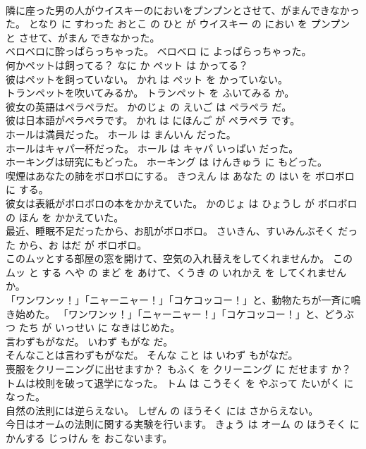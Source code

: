 \documentclass[8pt]{extreport}
\begin{document}
\begin{CJK}{UTF8}{min}
\\	隣に座った男の人がウイスキーのにおいをプンプンとさせて、がまんできなかった。	となり に すわった おとこ の ひと が ウイスキー の におい を プンプン と させて、がまん できなかった。	
\\	ベロベロに酔っぱらっちゃった。	ベロベロ に よっぱらっちゃった。	
\\	何かペットは飼ってる？	なに か ペット は かってる？	
\\	彼はペットを飼っていない。	かれ は ペット を かっていない。	
\\	トランペットを吹いてみるか。	トランペット を ふいてみる か。	
\\	彼女の英語はペラペラだ。	かのじょ の えいご は ペラペラ だ。	
\\	彼は日本語がペラペラです。	かれ は にほんご が ペラペラ です。	
\\	ホールは満員だった。	ホール は まんいん だった。	
\\	ホールはキャパ一杯だった。	ホール は キャパ いっぱい だった。	
\\	ホーキングは研究にもどった。	ホーキング は けんきゅう に もどった。	
\\	喫煙はあなたの肺をボロボロにする。	きつえん は あなた の はい を ボロボロ に する。	
\\	彼女は表紙がボロボロの本をかかえていた。	かのじょ は ひょうし が ボロボロ の ほん を かかえていた。	
\\	最近、睡眠不足だったから、お肌がボロボロ。	さいきん、すいみんぶそく だった から、お はだ が ボロボロ。	
\\	このムッとする部屋の窓を開けて、空気の入れ替えをしてくれませんか。	この ムッ と する へや の まど を あけて、くうき の いれかえ を してくれません か。	
\\	「ワンワンッ！」「ニャーニャー！」「コケコッコー！」と、動物たちが一斉に鳴き始めた。	「ワンワンッ！」「ニャーニャー！」「コケコッコー！」と、どうぶつ たち が いっせい に なきはじめた。	
\\	言わずもがなだ。	いわず もがな だ。	
\\	そんなことは言わずもがなだ。	そんな こと は いわず もがなだ。	
\\	喪服をクリーニングに出せますか？	もふく を クリーニング に だせます か？	
\\	トムは校則を破って退学になった。	トム は こうそく を やぶって たいがく に なった。	
\\	自然の法則には逆らえない。	しぜん の ほうそく には さからえない。	
\\	今日はオームの法則に関する実験を行います。	きょう は オーム の ほうそく に かんする じっけん を おこないます。	

\end{CJK}
\end{document}
